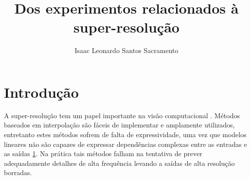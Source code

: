 \documentclass[a4paper,10pt]{report}
\title{Dos experimentos relacionados à super-resolução}
\author{Isaac Leonardo Santos Sacramento}
\begin{document}
\maketitle

\begin{abstract}
\end{abstract}

\chapter{Introdução}

A super-resolução tem um papel importante na visão computacional \cite{}.
Métodos baseados em interpolação são fáceis de implementar e amplamente utilizados,
entretanto estes métodos sofrem de falta de expressividade, uma vez que modelos lineares
não são capazes de expressar dependências complexas entre as entradas e as saídas \ref{}.
Na prática tais métodos falham na tentativa de prever adequadamente detalhes de alta frequência
levando a saídas de alta resolução borradas.
\end{document}
